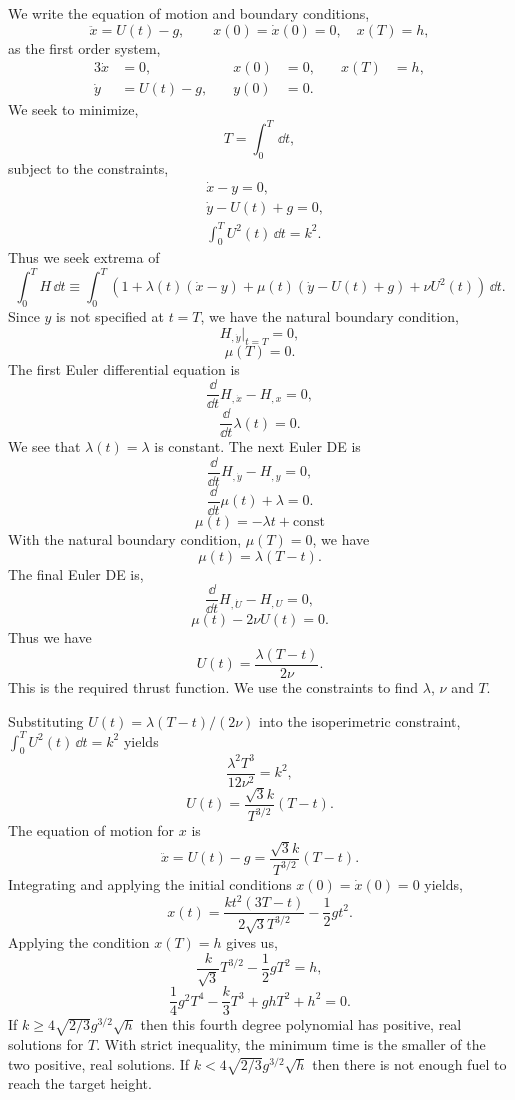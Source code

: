 \begin{Solution}
  We write the equation of motion and boundary conditions,
  \[
  \ddot{x} = U(t) - g, \qquad x(0) = \dot{x}(0) = 0, \quad x(T) = h,
  \]
  as the first order system,
  \begin{alignat*}{3}
    \dot{x} &= 0, &\quad x(0) &= 0, &\quad x(T) &= h, \\
    \dot{y} &= U(t) - g, &\quad y(0) &= 0. &\quad &
  \end{alignat*}
  We seek to minimize,
  \[
  T = \int_0^T \,\dd t,
  \]
  subject to the constraints,
  \begin{align*}
    &\dot{x} - y = 0, \\
    &\dot{y} - U(t) + g = 0, \\
    &\int_0^T U^2(t)\,\dd t = k^2.
  \end{align*}
  Thus we seek extrema of
  \[
  \int_0^T H\,\dd t \equiv
  \int_0^T \left( 1 + \lambda(t) (\dot{x} - y) + \mu(t) (\dot{y} - U(t) + g)
    + \nu U^2(t) \right) \,\dd t.
  \]
  Since $y$ is not specified at $t = T$, we have the natural boundary condition,
  \[
  H_{,\dot{y}} \big|_{t=T} = 0,
  \]
  \[
  \mu(T) = 0.
  \]
  The first Euler differential equation is
  \[
  \frac{\dd}{\dd t} H_{,\dot{x}} - H_{,x} = 0,
  \]
  \[
  \frac{\dd}{\dd t} \lambda(t) = 0.
  \]
  We see that $\lambda(t) = \lambda$ is constant.
  The next Euler DE is
  \[
  \frac{\dd}{\dd t} H_{,\dot{y}} - H_{,y} = 0,
  \]
  \[
  \frac{\dd}{\dd t} \mu(t) + \lambda = 0.
  \]
  \[
  \mu(t) = - \lambda t + \mathrm{const}
  \]
  With the natural boundary condition, $\mu(T) = 0$, we have
  \[
  \mu(t) = \lambda (T - t).
  \]
  The final Euler DE is,
  \[
  \frac{\dd}{\dd t} H_{,\dot{U}} - H_{,U} = 0,
  \]
  \[
  \mu(t) - 2 \nu U(t) = 0.
  \]
  Thus we have
  \[
  U(t) =  \frac{ \lambda (T - t) }{2 \nu }.
  \]
  This is the required thrust function.  We use the constraints to find
  $\lambda$, $\nu$ and $T$.

  Substituting $U(t) = \lambda (T - t) / (2 \nu)$ into the isoperimetric 
  constraint, $\int_0^T U^2(t)\,\dd t = k^2$ yields
  \[
  \frac{ \lambda^2 T^3 }{ 12 \nu^2 } = k^2,
  \]
  \[
  \boxed{
    U(t) = \frac{ \sqrt{3} k }{ T^{3/2} } (T - t).
    }
  \]
  The equation of motion for $x$ is
  \[
  \ddot{x} = U(t) - g = \frac{ \sqrt{3} k }{ T^{3/2} } (T - t).
  \]
  Integrating and applying the initial conditions $x(0) = \dot{x}(0) = 0$
  yields,
  \[
  x(t) = \frac{ k t^2 (3 T - t) }{ 2 \sqrt{3} T^{3/2} } - \frac{1}{2} g t^2.
  \]
  Applying the condition $x(T) = h$ gives us,
  \[
  \frac{ k }{ \sqrt{3} } T^{3/2} - \frac{1}{2} g T^2 = h,
  \]
  \[
  \boxed{
    \frac{1}{4} g^2 T^4  - \frac{k}{3} T^3 + g h T^2 + h^2 = 0.
    }
  \]
  If $k \geq 4 \sqrt{2/3} g^{3/2} \sqrt{h}$ then this fourth degree polynomial 
  has positive, real solutions for $T$.  With strict inequality, the minimum
  time is the smaller of the two positive, real solutions.
  If $k < 4 \sqrt{2/3} g^{3/2} \sqrt{h}$ then there is not enough fuel to
  reach the target height.
\end{Solution}



